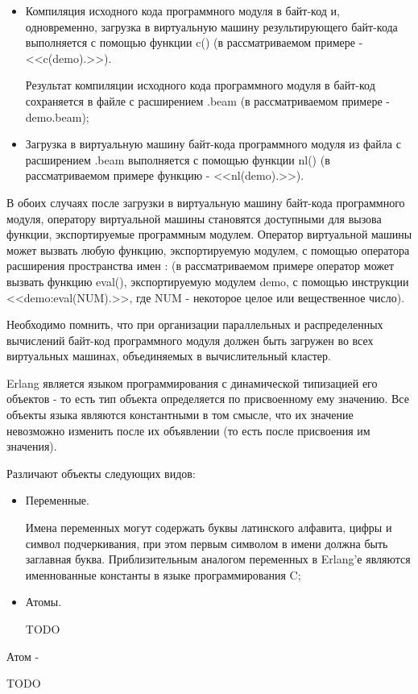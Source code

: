\begin{itemize}
\begin{itemize}
		\item Компиляция исходного кода программного модуля в байт-код и, одновременно, загрузка в виртуальную машину результирующего байт-кода выполняется с помощью функции c() (в рассматриваемом примере - <<c(demo).>>).

		Результат компиляции исходного кода программного модуля в байт-код сохраняется в файле с расширением .beam (в рассматриваемом примере - demo.beam);

		\item Загрузка в виртуальную машину байт-кода программного модуля из файла с расширением .beam выполняется с помощью функции nl() (в рассматриваемом примере функцию - <<nl(demo).>>).

	\end{itemize}

	В обоих случаях после загрузки в виртуальную машину байт-кода программного модуля, оператору виртуальной машины становятся доступными для вызова функции, экспортируемые программным модулем. Оператор виртуальной машины может вызвать любую функцию, экспортируемую модулем, с помощью оператора расширения пространства имен : (в рассматриваемом примере оператор может вызвать функцию eval(), экспортируемую модулем demo, с помощью инструкции <<demo:eval(NUM).>>, где NUM - некоторое целое или вещественное число).

	Необходимо помнить, что при организации параллельных и распределенных вычислений байт-код программного модуля должен быть загружен во всех виртуальных машинах, объединяемых в вычислительный кластер.

\end{itemize}



Erlang является языком программирования с динамической типизацией его объектов - то есть тип объекта определяется по присвоенному ему значению. Все объекты языка являются константными в том смысле, что их значение невозможно изменить после их объявлении (то есть после присвоения им значения).

Различают объекты следующих видов:

\begin{itemize}

	\item Переменные.

	Имена переменных могут содержать буквы латинского алфавита, цифры и символ подчеркивания, при этом первым символом в имени должна быть заглавная буква. Приблизительным аналогом переменных в Erlang'е являются именнованные константы в языке программирования C;

	\item Атомы.

TODO

\end{itemize}
	Атом -


TODO

